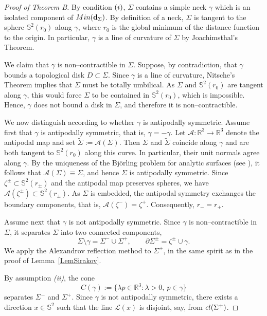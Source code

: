 \documentclass[11pt]{article}
\numberwithin{equation} {section}
\begin{document}
\begin{proof}[Proof of Theorem B]

By condition ${\rm (i)}$, $\Sigma$ contains a simple neck $\gamma$ which is an isolated component of ${\rm Min}({\bf d}_\Sigma)$. By definition of a neck, $\Sigma$ is tangent to the sphere $\mathbb{S}^2(r_0)$ along $\gamma$,
where $r_0$ is the global minimum of the distance function to the origin.
In particular, $\gamma$ is a line of curvature of $\Sigma$ by Joachimsthal's Theorem.

We claim that $\gamma$ is non--contractible in $\Sigma$.
Suppose, by contradiction, that $\gamma$ bounds a topological disk $D\subset\Sigma$.
Since $\gamma$ is a line of curvature, Nitsche's Theorem \cite{JNit} implies that
$\Sigma$ must be totally umbilical.
As $\Sigma$ and $\mathbb{S}^2(r_0)$ are tangent along $\gamma$, this would force
$\Sigma$ to be contained in $\mathbb{S}^2(r_0)$, which is impossible.
Hence, $\gamma$ does not bound a disk in $\Sigma$, and therefore it is non--contractible.

We now distinguish according to whether $\gamma$ is antipodally symmetric.
Assume first that $\gamma$ is antipodally symmetric, that is, $\gamma=-\gamma$.
Let $\mathcal A:\mathbb{R}^3\to\mathbb{R}^3$ denote the antipodal map and set
$\tilde\Sigma:=\mathcal A(\Sigma)$.
Then $\Sigma$ and $\tilde\Sigma$ coincide along $\gamma$ and are both tangent to
$\mathbb{S}^2(r_0)$ along this curve.
In particular, their unit normals agree along $\gamma$.
By the uniqueness of the Bj\"orling problem for analytic surfaces (see \cite{Brander}),
it follows that $\mathcal A(\Sigma)\equiv\Sigma$, and hence $\Sigma$ is antipodally symmetric. Since $\zeta^\pm\subset\mathbb{S}^2(r_\pm)$ and the antipodal map preserves spheres,
we have $\mathcal A(\zeta^\pm)\subset\mathbb{S}^2(r_\pm)$.
As $\Sigma$ is embedded, the antipodal symmetry exchanges the boundary components,
that is, $\mathcal A(\zeta^-)=\zeta^+$.
Consequently, $r_-=r_+$.

Assume next that $\gamma$ is not antipodally symmetric.
Since $\gamma$ is non--contractible in $\Sigma$, it separates $\Sigma$ into two connected components,
\[
\Sigma\setminus\gamma=\Sigma^-\cup\Sigma^+,
\qquad
\partial\Sigma^\pm=\zeta^\pm\cup\gamma .
\]
We apply the Alexandrov reflection method to $\Sigma^+$, in the same spirit as in the proof of Lemma~\ref{LemSirakov}.

By assumption {\it (ii)}, the cone
\[
C(\gamma):=\{\lambda p\in\mathbb{R}^3:\lambda>0,\ p\in\gamma\}
\]
separates $\Sigma^-$ and $\Sigma^+$.
Since $\gamma$ is not antipodally symmetric, there exists a direction $x\in\mathbb{S}^2$
such that the line $\mathcal L(x)$ is disjoint, say, from $\textup{cl}(\Sigma^+)$.


\end{proof}
\end{document}
